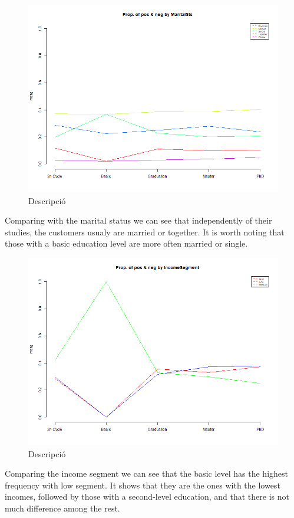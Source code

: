 \begin{figure}[H]
    \centering
    \includegraphics[width=0.8\linewidth]{Imatges/prop_cond_class_MaritalSts_4_legend.png}
    \caption{Descripció}
    \label{fig:scree_plot}
\end{figure}
\newline
Comparing with the marital status we can see that independently of their studies, the customers usualy are married or together. It is worth noting that those with a basic education level are more often married or single.
\begin{figure}[H]
    \centering
    \includegraphics[width=0.8\linewidth]{Imatges/prop_cond_class_IncomeSegment_4_legend.png}
    \caption{Descripció}
    \label{fig:scree_plot}
\end{figure}
\newline
Comparing the income segment we can see that the basic level has the highest frequency with low segment. It shows that they are the ones with the lowest incomes, followed by those with a second-level education, and that there is not much difference among the rest.
